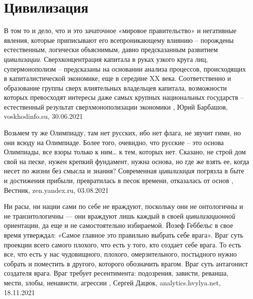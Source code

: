  
 
 
 
 
\chapter{Цивилизация}
\label{sec:slova.civilizacia}

В том то и дело, что и это зачаточное «мировое правительство» и негативные
явления, которые приписывают его всепроникающему влиянию – порождены
естественным, логически объяснимым, давно предсказанным развитием \emph{цивилизации}.
Сверхконцентрация капитала в руках узкого круга лиц, супермонополизм –
предсказаны на основании анализа процессов, происходящих в капиталистической
экономике, еще в середине XX века. Соответственно и образование группы сверх
влиятельных владельцев капитала, возможности которых превосходят интересы даже
самых крупных национальных государств – естественный результат
сверхмонополизации экономики
, 
Юрий Барбашов, voskhodinfo.su, 30.06.2021

Возьмем ту же Олимпиаду, там нет русских, ибо нет флага, не звучит гимн, но они
всюду на Олимпиаде. Более того, очевидно, что русские – это основа Олимпиады,
все взоры только к ним… к тем, которых нет.  Сказано, не строй дом свой на
песке, нужен крепкий фундамент, нужна основа, но где же взять ее, когда несет
по жизни без смысла и знания? Современная \emph{цивилизация} погрязла в быте и
достижения прибыли, превратилась в песок времени, отказалась от основ
, Вестник, zen.yandex.ru, 03.08.2021

Ни расы, ни нации сами по себе не враждуют, поскольку они не онтологичны и не
транзитологичны — они враждуют лишь каждый в своей \emph{цивилизационной} ориентации,
да еще и не самостоятельно избираемой.  Йозеф Геббельс в свое время утверждал:
«Самое главное это правильно выбрать себе врага».  Враг суть проекции всего
самого плохого, что есть у того, кто создает себе врага. То есть все, что есть
у нас чудовищного, плохого, омерзительного, постыдного нужно собрать и
поместить в другого, которого обозначить врагом. Враг суть антагонист создателя
врага. Враг требует ресентимента: подозрения, зависти, реванша, мести, злобы,
ненависти, агрессии
, Сергей Дацюк, analytics.hvylya.net, 18.11.2021
